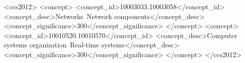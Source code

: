 \documentclass[acmsmall]{acmart}
\begin{document}
\begin{CCSXML}
	<ccs2012>
	<concept>
	<concept_id>10003033.10003058</concept_id>
	<concept_desc>Networks~Network components</concept_desc>
	<concept_significance>300</concept_significance>
	</concept>
	<concept>
	<concept_id>10010520.10010570</concept_id>
	<concept_desc>Computer systems organization~Real-time systems</concept_desc>
	<concept_significance>300</concept_significance>
	</concept>
	</ccs2012>
\end{CCSXML}





\maketitle

\fancyfoot{}
\thispagestyle{empty}






%




%


\end{document}
